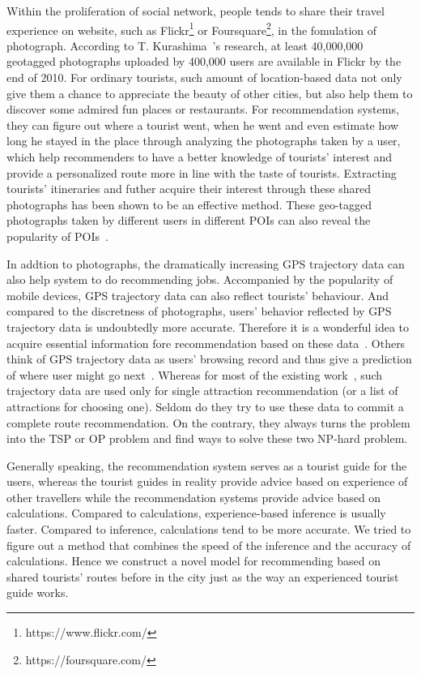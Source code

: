 \documentclass[runningheads]{llncs}
\begin{document}
Within the proliferation of social network, people tends to share their travel experience on website, such as Flickr\footnote{https://www.flickr.com/} or Foursquare\footnote{https://foursquare.com/}, in the fomulation of photograph. According to T. Kurashima~\cite{Kurashima:2010:TRR:1871437.1871513}'s research, at least 40,000,000 geotagged photographs uploaded by 400,000 users are available in Flickr by the end of 2010. For ordinary tourists, such amount of location-based data not only give them a chance to appreciate the beauty of other cities, but also help them to discover some admired fun places or restaurants. For recommendation systems, they can figure out where a tourist went, when he went and even estimate how long he stayed in the place through analyzing the photographs taken by a user, which help recommenders to have a better knowledge of tourists' interest and provide a personalized route more in line with the taste of tourists. Extracting tourists' itineraries and futher acquire their interest through these shared photographs has been shown to be an effective method. These geo-tagged photographs taken by different users in different POIs can also reveal the popularity of POIs~\cite{lim2015personalized,memon2015travel}. 

In addtion to photographs, the dramatically increasing GPS trajectory data can also help system to do recommending jobs. Accompanied by the popularity of mobile devices, GPS trajectory data can also reflect tourists' behaviour. And compared to the discretness of photographs, users' behavior reflected by GPS trajectory data is undoubtedly more accurate. Therefore it is a wonderful idea to acquire essential information fore recommendation based on these data~\cite{7113313,Zheng:2009:MIL:1526709.1526816}. Others think of GPS trajectory data as users' browsing record and thus give a prediction of where user might go next~\cite{doi:10.1111/tgis.12248}. Whereas for most of the existing work~\cite{7113313}, such trajectory data are used only for single attraction recommendation (or a list of attractions for choosing one). Seldom do they try to use these data to commit a complete route recommendation. On the contrary, they always turns the problem into the TSP or OP problem and find ways to solve these two NP-hard problem. 

Generally speaking, the recommendation system serves as a tourist guide for the users, whereas the tourist guides in reality provide advice based on experience of other travellers while the recommendation systems provide advice based on calculations. Compared to calculations, experience-based inference is usually faster. Compared to inference, calculations tend to be more accurate. We tried to figure out a method that combines the speed of the inference and the accuracy of calculations. Hence we construct a novel model for recommending based on shared tourists' routes before in the city just as the way an experienced tourist guide works.
\end{document}
